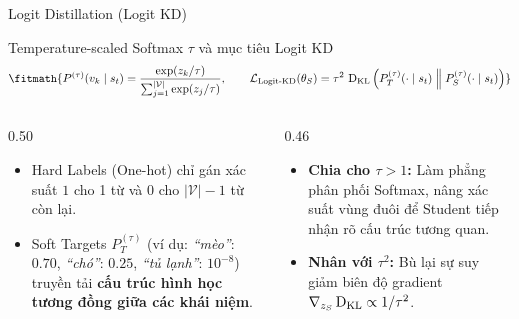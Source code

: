 \begin{frame}{Logit Distillation (Logit KD)}
  \begin{block}{Temperature-scaled Softmax $\tau$ và mục tiêu Logit KD}
    \[
      \fitmath{%
      P^{(\tau)}(v_k \mid s_t) = \frac{\exp(z_k / \tau)}{\sum_{j=1}^{|\mathcal{V}|} \exp(z_j / \tau)}, \qquad
      \mathcal{L}_{\text{Logit-KD}}(\theta_S) = \tau^2 \, \DKL\Big( P_T^{(\tau)}(\cdot \mid s_t) \;\Big\|\; P_S^{(\tau)}(\cdot \mid s_t) \Big)
      }
    \]
  \end{block}

  \begin{columns}[T,onlytextwidth]
    \begin{column}{0.50\textwidth}
      \small
      \begin{itemize}\setlength{\itemsep}{4pt}
        \item Hard Labels (One-hot) chỉ gán xác suất $1$ cho 1 từ và $0$ cho $|\mathcal{V}|-1$ từ còn lại.
        \item Soft Targets $P_T^{(\tau)}$ (ví dụ: \textit{``mèo''}: $0.70$, \textit{``chó''}: $0.25$, \textit{``tủ lạnh''}: $10^{-8}$) truyền tải \textbf{cấu trúc hình học tương đồng giữa các khái niệm}.
      \end{itemize}
    \end{column}
    \begin{column}{0.46\textwidth}
      \small
      \begin{itemize}\setlength{\itemsep}{4pt}
        \item \textbf{Chia cho $\tau > 1$:} Làm phẳng phân phối Softmax, nâng xác suất vùng đuôi để Student tiếp nhận rõ cấu trúc tương quan.
        \item \textbf{Nhân với $\tau^2$:} Bù lại sự suy giảm biên độ gradient $\nabla_{z_S}\operatorname{D_{\mathrm{KL}}} \propto 1/\tau^2$.
      \end{itemize}
    \end{column}
  \end{columns}
  \par\vspace{0pt}
\end{frame}

